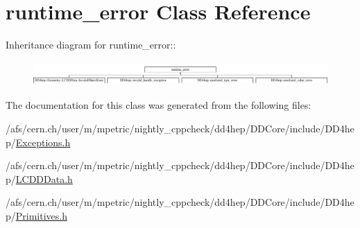 \hypertarget{classstd_1_1runtime__error}{
\section{runtime\_\-error Class Reference}
\label{classstd_1_1runtime__error}
}
Inheritance diagram for runtime\_\-error::\begin{figure}[H]
\begin{center}
\leavevmode
\includegraphics[height=0.927152cm]{classstd_1_1runtime__error}
\end{center}
\end{figure}


The documentation for this class was generated from the following files:\begin{DoxyCompactItemize}
\item 
/afs/cern.ch/user/m/mpetric/nightly\_\-cppcheck/dd4hep/DDCore/include/DD4hep/\hyperlink{_d_d_core_2include_2_d_d4hep_2_exceptions_8h}{Exceptions.h}\item 
/afs/cern.ch/user/m/mpetric/nightly\_\-cppcheck/dd4hep/DDCore/include/DD4hep/\hyperlink{_l_c_d_d_data_8h}{LCDDData.h}\item 
/afs/cern.ch/user/m/mpetric/nightly\_\-cppcheck/dd4hep/DDCore/include/DD4hep/\hyperlink{_primitives_8h}{Primitives.h}\end{DoxyCompactItemize}
